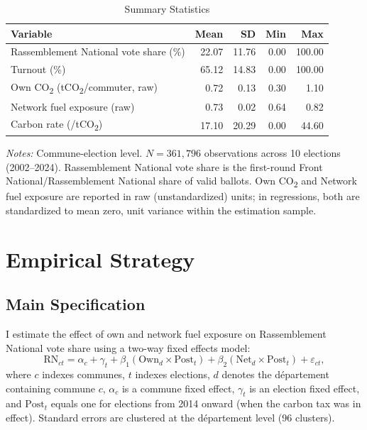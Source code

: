 \documentclass[12pt]{article}
\providecommand{\euro}{\texteuro}
\newcommand{\rn}{Rassemblement National}
\newcommand{\fn}{Front National}
\newcommand{\dept}{d\'{e}partement}
\begin{document}
\begin{table}[H]
\centering
\caption{Summary Statistics}
\label{tab:summary}
\begin{threeparttable}
\begin{tabular}{@{}lrrrr@{}}
\toprule
Variable & Mean & SD & Min & Max \\
\midrule
\rn{} vote share (\%) & 22.07 & 11.76 & 0.00 & 100.00 \\
Turnout (\%) & 65.12 & 14.83 & 0.00 & 100.00 \\
Own CO\textsubscript{2} (tCO\textsubscript{2}/commuter, raw) & 0.72 & 0.13 & 0.30 & 1.10 \\
Network fuel exposure (raw) & 0.73 & 0.02 & 0.64 & 0.82 \\
Carbon rate (\euro/tCO\textsubscript{2}) & 17.10 & 20.29 & 0.00 & 44.60 \\
\bottomrule
\end{tabular}
\begin{tablenotes}
\small
\item \textit{Notes:} Commune-election level. $N = 361{,}796$ observations across 10 elections (2002--2024). \rn{} vote share is the first-round \fn{}/\rn{} share of valid ballots. Own CO\textsubscript{2} and Network fuel exposure are reported in raw (unstandardized) units; in regressions, both are standardized to mean zero, unit variance within the estimation sample.
\end{tablenotes}
\end{threeparttable}
\end{table}



\section{Empirical Strategy}
\label{sec:strategy}

\subsection{Main Specification}

I estimate the effect of own and network fuel exposure on \rn{} vote share using a two-way fixed effects model:
\begin{equation}
\text{RN}_{ct} = \alpha_c + \gamma_t + \beta_1 (\text{Own}_d \times \text{Post}_t) + \beta_2 (\text{Net}_d \times \text{Post}_t) + \varepsilon_{ct},
\label{eq:main}
\end{equation}
where $c$ indexes communes, $t$ indexes elections, $d$ denotes the \dept{} containing commune $c$, $\alpha_c$ is a commune fixed effect, $\gamma_t$ is an election fixed effect, and $\text{Post}_t$ equals one for elections from 2014 onward (when the carbon tax was in effect). Standard errors are clustered at the \dept{} level (96 clusters).
\end{document}
